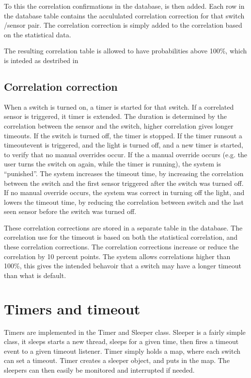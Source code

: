 To this the correlation confirmations in the database, is then added. Each row in the database table contains the accululated correlation correction for that switch \slash  sensor pair. The correlation correction is simply added to the correlation based on the statistical data.

The resulting correlation table is allowed to have probabilities above 100\%, which is inteded as destribed in 

\subsection{Correlation correction}
\label{correlationcorrection}

When a switch is turned on, a timer is started for that switch. If a correlated sensor is triggered, it timer is extended. The duration is determined by the correlation between the sensor and the switch, higher correlation gives longer timeouts. If the switch is turned off, the timer is stopped. If the timer runsout a timeoutevent is triggered, and the light is turned off, and a new timer is started, to verify that no manual overrides occur. If the a manual override occurs (e.g. the user turns the switch on again, while the timer is running), the system is ``punished''. The system increases the timeout time, by increasing the correlation between the switch and the first sensor triggered after the switch was turned off. If no manual override occurs, the system was correct in turning off the light, and lowers the timeout time, by reducing the correlation between switch and the last seen sensor before the switch was turned off.

These correlation corrections are stored in a separate table in the database. The correlation use for the timeout is based on both the statistical correlation, and these correlation corrections. The correlation corrections increase or reduce the correlation by 10 percent points. The system allows correlations higher than 100\%, this gives the intended behavoir that a switch may have a longer timeout than what is default.

\section{Timers and timeout}
\label{timersandtimeout}

Timers are implemented in the Timer and Sleeper class. Sleeper is a fairly simple class, it sleeps starts a new thread, sleeps for a given time, then fires a timeout event to a given timeout listener. Timer simply holds a map, where each switch can set a timeout. Timer creates a sleeper object, and puts in the map. The sleepers can then easily be monitored and interrupted if needed. 

